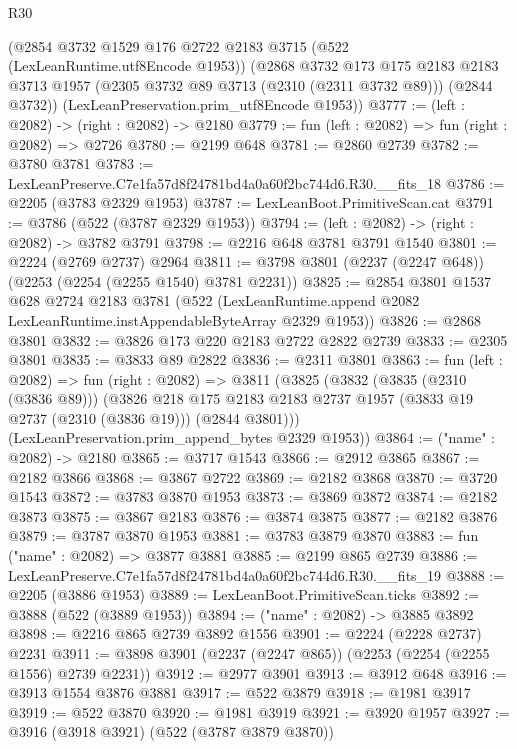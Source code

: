 \begin{lexlean}{R30}
\begin{coremodule}
    (@2854
      @3732
      @1529
      @176
      @2722
      @2183
      @3715
      (@522 (LexLeanRuntime.utf8Encode @1953))
      (@2868
        @3732
        @173
        @175
        @2183
        @2183
        @3713
        @1957
        (@2305 @3732 @89 @3713 (@2310 (@2311 @3732 @89)))
        (@2844 @3732))
      (LexLeanPreservation.prim_utf8Encode @1953))
@3777 := (left : @2082) -> (right : @2082) -> @2180
@3779 := fun (left : @2082) => fun (right : @2082) => @2726
@3780 := @2199 @648
@3781 := @2860 @2739
@3782 := @3780 @3781
@3783 := LexLeanPreserve.C7e1fa57d8f24781bd4a0a60f2bc744d6.R30.__fits_18
@3786 := @2205 (@3783 @2329 @1953)
@3787 := LexLeanBoot.PrimitiveScan.cat
@3791 := @3786 (@522 (@3787 @2329 @1953))
@3794 := (left : @2082) -> (right : @2082) -> @3782 @3791
@3798 := @2216 @648 @3781 @3791 @1540
@3801 := @2224 (@2769 @2737) @2964
@3811 := @3798 @3801 (@2237 (@2247 @648)) (@2253 (@2254 (@2255 @1540) @3781 @2231))
@3825 := @2854
    @3801
    @1537
    @628
    @2724
    @2183
    @3781
    (@522 (LexLeanRuntime.append @2082 LexLeanRuntime.instAppendableByteArray @2329 @1953))
@3826 := @2868 @3801
@3832 := @3826 @173 @220 @2183 @2722 @2822 @2739
@3833 := @2305 @3801
@3835 := @3833 @89 @2822
@3836 := @2311 @3801
@3863 := fun (left : @2082) =>
  fun (right : @2082) =>
  @3811
    (@3825
      (@3832
        (@3835 (@2310 (@3836 @89)))
        (@3826
          @218
          @175
          @2183
          @2183
          @2737
          @1957
          (@3833 @19 @2737 (@2310 (@3836 @19)))
          (@2844 @3801)))
      (LexLeanPreservation.prim_append_bytes @2329 @1953))
@3864 := ("name" : @2082) -> @2180
@3865 := @3717 @1543
@3866 := @2912 @3865
@3867 := @2182 @3866
@3868 := @3867 @2722
@3869 := @2182 @3868
@3870 := @3720 @1543
@3872 := @3783 @3870 @1953
@3873 := @3869 @3872
@3874 := @2182 @3873
@3875 := @3867 @2183
@3876 := @3874 @3875
@3877 := @2182 @3876
@3879 := @3787 @3870 @1953
@3881 := @3783 @3879 @3870
@3883 := fun ("name" : @2082) => @3877 @3881
@3885 := @2199 @865 @2739
@3886 := LexLeanPreserve.C7e1fa57d8f24781bd4a0a60f2bc744d6.R30.__fits_19
@3888 := @2205 (@3886 @1953)
@3889 := LexLeanBoot.PrimitiveScan.ticks
@3892 := @3888 (@522 (@3889 @1953))
@3894 := ("name" : @2082) -> @3885 @3892
@3898 := @2216 @865 @2739 @3892 @1556
@3901 := @2224 (@2228 @2737) @2231
@3911 := @3898 @3901 (@2237 (@2247 @865)) (@2253 (@2254 (@2255 @1556) @2739 @2231))
@3912 := @2977 @3901
@3913 := @3912 @648
@3916 := @3913 @1554 @3876 @3881
@3917 := @522 @3879
@3918 := @1981 @3917
@3919 := @522 @3870
@3920 := @1981 @3919
@3921 := @3920 @1957
@3927 := @3916 (@3918 @3921) (@522 (@3787 @3879 @3870))

\end{coremodule}
\end{lexlean}
